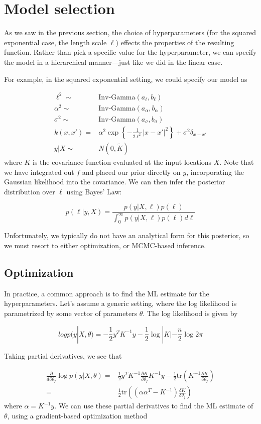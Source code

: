 \documentclass[twoside]{article}
\begin{document}
  
\section{Model selection}


As we saw in the previous section, the choice of hyperparameters (for the squared exponential case, the length scale $\ell$) effects the properties of the resulting function. Rather than pick a specific value for the hyperparameter, we can specify the model in a hierarchical manner---just like we did in the linear case.

For example, in the squared exponential setting, we could specify our model as

$$\begin{aligned}
  \ell^2 \sim& \mbox{Inv-Gamma}(a_\ell, b_\ell)\\
  \alpha^2 \sim& \mbox{Inv-Gamma}(a_\alpha, b_\alpha)\\
  \sigma^2 \sim& \mbox{Inv-Gamma}(a_\sigma, b_\sigma)\\
  k(x,x') =& \alpha^2\exp\left\{-\frac{1}{2\ell^2}|x-x'|^2\right\}+\sigma^2\delta_{x-x'}\\
  y|X \sim& N(0,\tilde{K})
\end{aligned}
$$
where $K$ is the covariance function evaluated at the input locations $X$. Note that we have integrated out $f$ and placed our prior directly on $y$, incorporating the Gaussian likelihood into the covariance. We can then infer the posterior distribution over $\ell$ using Bayes' Law:

 $$p(\ell|y,X) = \frac{p(y|X,\ell)p(\ell)}{\int_0^\infty p(y|X,\ell)p(\ell)d\ell}$$

 Unfortunately, we typically do not have an analytical form for this posterior, so we must resort to either optimization, or MCMC-based inference.

 \subsection{Optimization}
 In practice, a common approach is to find the ML estimate for the hyperparameters. Let's assume a generic setting, where the log likelihood is parametrized by some vector of parameters $\theta$. The log likelihood is given by

 $$log p(y|X,\theta) = -\frac{1}{2}y^TK^{-1}y - \frac{1}{2}\log|K|-\frac{n}{2}\log 2 \pi$$

 Taking partial derivatives, we see that

 $$\begin{aligned}\frac{\partial}{d\partial \theta_j} \log p(y|X,\theta) =& \frac{1}{2}y^TK^{-1}\frac{\partial K}{\partial \theta_j} K^{-1}y - \frac{1}{2}\mbox{tr}\left(K^{-1}\frac{\partial K}{\partial \theta_j}\right)\\
   =& \frac{1}{2}\mbox{tr}\left((\alpha \alpha^T - K^{-1})\frac{\delta K}{\delta \theta_j}\right)\end{aligned}
 $$
 where $\alpha = K^{-1}y$. We can use these partial derivatives to find the ML estimate of $\theta$, using a gradient-based optimization method
\end{document}
